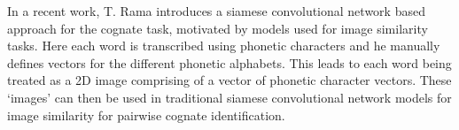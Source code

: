 In a recent work, T. Rama \cite{rama2016siamese} introduces a siamese convolutional network based approach for the cognate task, motivated by models used for image similarity tasks. Here each word is transcribed using phonetic characters and he manually defines vectors for the different phonetic alphabets. This  leads to each word being treated as a 2D image comprising of a vector of phonetic character vectors. These `images' can then be used in traditional siamese convolutional network models for image similarity for pairwise cognate identification.

